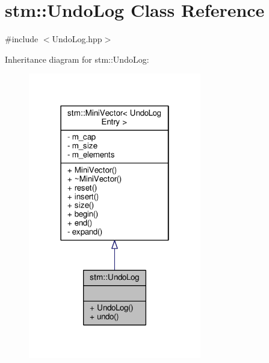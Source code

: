 \hypertarget{classstm_1_1UndoLog}{\section{stm\-:\-:Undo\-Log Class Reference}
\label{classstm_1_1UndoLog}
}


{\ttfamily \#include $<$Undo\-Log.\-hpp$>$}



Inheritance diagram for stm\-:\-:Undo\-Log\-:
\nopagebreak
\begin{figure}[H]
\begin{center}
\leavevmode
\includegraphics[width=214pt]{classstm_1_1UndoLog__inherit__graph}
\end{center}
\end{figure}


